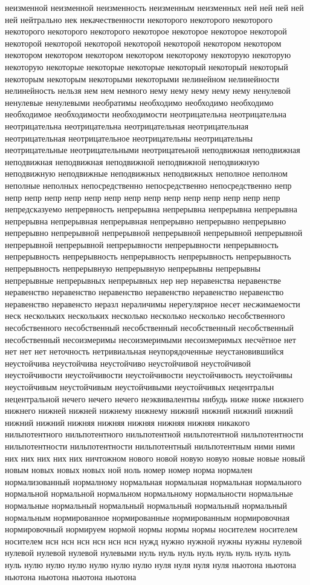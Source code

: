 неизменной неизменной неизменность неизменным неизменных ней ней ней ней ней нейтрально нек некачественности некоторого некоторого некоторого некоторого некоторого некоторого некоторое некоторое некоторое некоторой некоторой некоторой некоторой некоторой некоторой некотором некотором некотором некотором некотором некотором некоторому некоторую некоторую некоторую некоторые некоторые некоторые некоторый некоторый некоторый некоторым некоторым некоторыми некоторыми нелинейном нелинейности нелинейность нельзя нем нем немного нему нему нему нему нему ненулевой ненулевые ненулевыми необратимы необходимо необходимо необходимо необходимое необходимости необходимости неотрицательна неотрицательна неотрицательна неотрицательна неотрицательная неотрицательная неотрицательная неотрицательное неотрицательны неотрицательны неотрицательные неотрицательными неотрицатеьной неподвижная неподвижная неподвижная неподвижная неподвижной неподвижной неподвижную неподвижную неподвижные неподвижных неподвижных неполное неполном неполные неполных непосредственно непосредственно непосредственно непр непр непр непр непр непр непр непр непр непр непр непр непр непр непр непредсказуемо непрервность непрерывна непрерывна непрерывна непрерывна непрерывна непрерывная непрерывная непрерывно непрерывно непрерывно непрерывно непрерывной непрерывной непрерывной непрерывной непрерывной непрерывной непрерывной непрерывности непрерывности непрерывность непрерывность непрерывность непрерывность непрерывность непрерывность непрерывность непрерывную непрерывную непрерывны непрерывны непрерывные непрерывных непрерывных нер нер неравенства неравенстве неравенство неравенство неравенство неравенство неравенство неравенство неравенство неравенсто неразл нераличимы нерегулярное несет несжимаемости неск нескольких нескольких несколько несколько несколько несобственного несобственного несобственный несобственный несобственный несобственный несобственный несоизмеримы несоизмеримыми несоизмеримых несчётное нет нет нет нет неточность нетривиальная неупорядоченные неустановившийся неустойчива неустойчива неустойчиво неустойчивой неустойчивой неустойчивости неустойчивости неустойчивости неустойчивость неустойчивы неустойчивым неустойчивым неустойчивыми неустойчивых нецентральн нецентральной нечего нечего нечего неэквивалентны нибудь ниже ниже нижнего нижнего нижней нижней нижнему нижнему нижний нижний нижний нижний нижний нижний нижняя нижняя нижняя нижняя нижняя никакого нильпотентного нильпотентного нильпотентной нильпотентной нильпотентности нильпотентности нильпотентности нильпотентный нильпотентным ними ними них них них них них ничтожном нового новой новую новую новые новые новый новым новых новых новых ной ноль номер номер норма нормален нормализованный нормалному нормальная нормальная нормальная нормального нормальной нормальной нормальном нормальному нормальности нормальные нормальные нормальный нормальный нормальный нормальный нормальный нормальным нормированное нормированные нормированным нормировочная нормировочный нормируем нормой нормы нормы нормы носителем носителем носителем нсн нсн нсн нсн нсн нсн нужд нужно нужной нужны нужны нулевой нулевой нулевой нулевой нулевыми нуль нуль нуль нуль нуль нуль нуль нуль нуль нулю нулю нулю нулю нулю нулю нуля нуля нуля нуля ньютона ньютона ньютона ньютона ньютона ньютона 